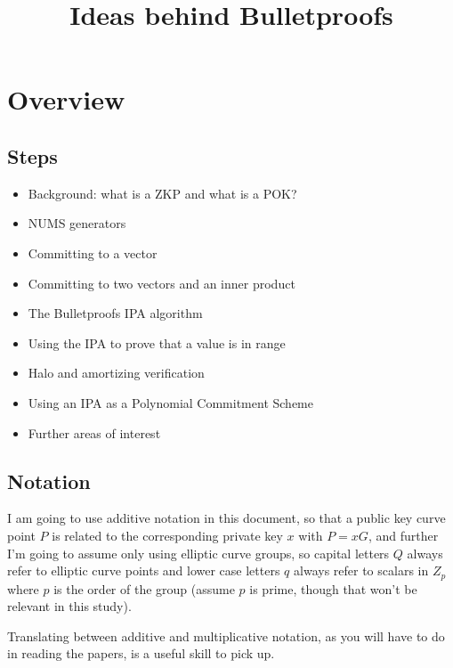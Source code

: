 \documentclass[10pt,a4paper]{article}
\begin{document}
\title{Ideas behind Bulletproofs}
\maketitle


\section{Overview}

\subsection{Steps}

\begin{itemize}
\item Background: what is a ZKP and what is a POK?
\item NUMS generators
\item Committing to a vector
\item Committing to two vectors and an inner product
\item The Bulletproofs IPA algorithm
\item Using the IPA to prove that a value is in range
\item Halo and amortizing verification
\item Using an IPA as a Polynomial Commitment Scheme
\item Further areas of interest

\end{itemize}

\subsection{Notation}

I am going to use additive notation in this document, so that a public key curve point $P$ is related to the corresponding private key $x$ with $P = xG$, and further I'm going to assume only using elliptic curve groups, so capital letters $Q$ always refer to elliptic curve points and lower case letters $q$ always refer to scalars in $Z_p$ where $p$ is the order of the group (assume $p$ is prime, though that won't be relevant in this study).

\vspace{5 pt}

Translating between additive and multiplicative notation, as you will have to do in reading the papers, is a useful skill to pick up.

\vspace{5 pt}
\end{document}

